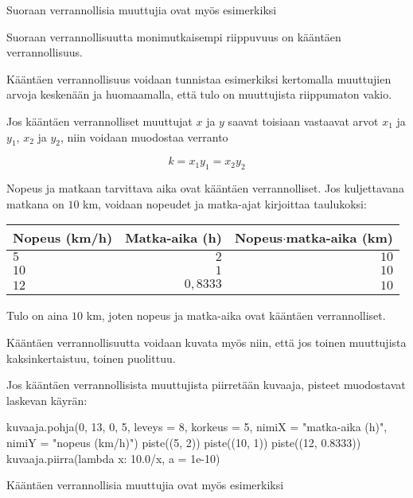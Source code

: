 Suoraan verrannollisia muuttujia ovat myös esimerkiksi
\begin{alakohdat}
\end{alakohdat}

Suoraan verrannollisuutta monimutkaisempi riippuvuus on kääntäen
verrannollisuus.


Kääntäen verrannollisuus voidaan tunnistaa esimerkiksi
kertomalla muuttujien arvoja keskenään ja huomaamalla,
että tulo on muuttujista riippumaton vakio.

Jos kääntäen verrannolliset muuttujat $x$ ja $y$ saavat toisiaan vastaavat arvot $x_1$ ja $y_1$, $x_2$ ja $y_2$, niin voidaan muodostaa verranto

$$ k = x_1y_1 = x_2y_2$$

\begin{esimerkki}
	Nopeus ja matkaan tarvittava aika ovat kääntäen verrannolliset.
	Jos kuljettavana matkana on $10$ km, voidaan nopeudet ja matka-ajat
	kirjoittaa taulukoksi:
	\begin{center} 
		\begin{tabular}{|l|r|r|}
			\hline
			Nopeus (km/h) & Matka-aika (h) & Nopeus$\cdot$matka-aika (km) \\
			\hline
			$5$ & $2$ & $10$ \\
			$10$ & $1$ & $10$ \\
			$12$ & $0,8333$ & $10$ \\
			\hline
		\end{tabular}
	\end{center}
	Tulo on aina $10$ km, joten nopeus ja matka-aika ovat kääntäen verrannolliset.
\end{esimerkki}

Kääntäen verrannollisuutta voidaan kuvata myös niin, että jos
toinen muuttujista kaksinkertaistuu, toinen puolittuu.

Jos kääntäen verrannollisista muuttujista piirretään kuvaaja, pisteet
muodostavat laskevan käyrän:

\begin{center}
\begin{kuva}
    kuvaaja.pohja(0, 13, 0, 5, leveys = 8, korkeus = 5, nimiX = "matka-aika (h)", nimiY = "nopeus (km/h)")
    piste((5, 2))
    piste((10, 1))
    piste((12, 0.8333))
    kuvaaja.piirra(lambda x: 10.0/x, a = 1e-10)
\end{kuva}
\end{center}

Kääntäen verrannollisia muuttujia ovat myös esimerkiksi
\begin{alakohdat}
\end{alakohdat}

